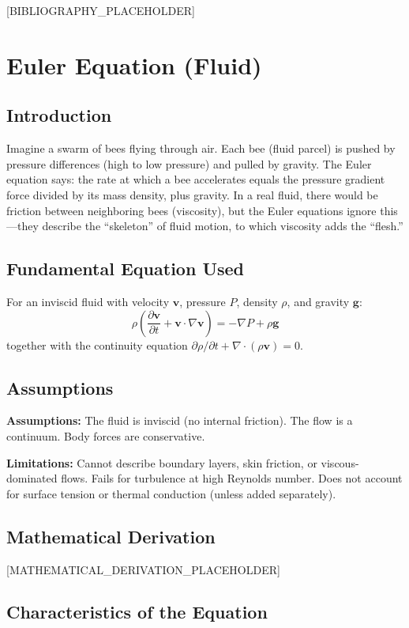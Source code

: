 \documentclass[11pt,openright]{book}
\begin{document}
[BIBLIOGRAPHY_PLACEHOLDER]


\chapter{Euler Equation (Fluid)}

\section*{Introduction}

Imagine a swarm of bees flying through air. Each bee (fluid parcel) is pushed by pressure differences (high to low pressure) and pulled by gravity. The Euler equation says: the rate at which a bee accelerates equals the pressure gradient force divided by its mass density, plus gravity. In a real fluid, there would be friction between neighboring bees (viscosity), but the Euler equations ignore this---they describe the ``skeleton'' of fluid motion, to which viscosity adds the ``flesh.''
\section*{Fundamental Equation Used}

For an inviscid fluid with velocity $\mathbf{v}$, pressure $P$, density $\rho$, and gravity $\mathbf{g}$:
\[
\rho\left(\frac{\partial \mathbf{v}}{\partial t} + \mathbf{v} \cdot \nabla \mathbf{v}\right) = -\nabla P + \rho \mathbf{g}
\]
together with the continuity equation $\partial \rho / \partial t + \nabla \cdot (\rho \mathbf{v}) = 0$.
\section*{Assumptions}

\textbf{Assumptions:} The fluid is inviscid (no internal friction). The flow is a continuum. Body forces are conservative.


\textbf{Limitations:} Cannot describe boundary layers, skin friction, or viscous-dominated flows. Fails for turbulence at high Reynolds number. Does not account for surface tension or thermal conduction (unless added separately).


\section*{Mathematical Derivation}

[MATHEMATICAL_DERIVATION_PLACEHOLDER]

\section*{Characteristics of the Equation}
\end{document}
